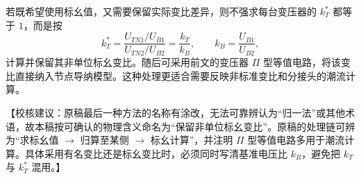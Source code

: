 \documentclass[
  12pt,
  UTF8,
  a4paper,
  fontset=fandol,
  oneside,
  openany
]{ctexrep}
\newcommand{\reviewnote}[1]{%
  \par\smallskip
  {\color{reviewgray}\small\noindent【校核建议：#1】\par}
  \smallskip
}
\begin{document}
若既希望使用标幺值，又需要保留实际变比差异，则不强求每台变压器的 $k_T^*$ 都等于 $1$，而是按
\begin{equation}
  k_T^*
  =\frac{U_{TN1}/U_{B1}}{U_{TN2}/U_{B2}}
  =\frac{k_T}{k_B},
  \qquad
  k_B=\frac{U_{B1}}{U_{B2}},
\end{equation}
计算并保留其非单位标幺变比。随后可采用前文的变压器 $\Pi$ 型等值电路，将该变比直接纳入节点导纳模型。这种处理更适合需要反映非标准变比和分接头的潮流计算。

\reviewnote{原稿最后一种方法的名称有涂改，无法可靠辨认为“归一法”或其他术语，故本稿按可确认的物理含义命名为“保留非单位标幺变比”。原稿的处理链可辨为“求标幺值 $\rightarrow$ 归算至某侧 $\rightarrow$ 标幺计算”，并注明 $\Pi$ 型等值电路多用于潮流计算。具体采用有名变比还是标幺变比时，必须同时写清基准电压比 $k_B$，避免把 $k_T$ 与 $k_T^*$ 混用。}
\end{document}
